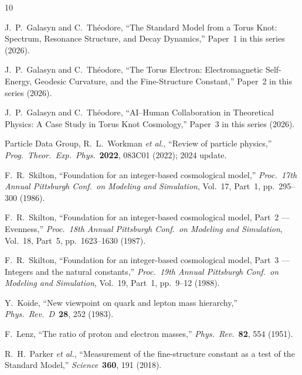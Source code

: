 \documentclass[11pt,a4paper]{article}
\begin{document}
\begin{thebibliography}{10}

J.~P.~Galasyn and C.~Th\'eodore,
``The Standard Model from a Torus Knot: Spectrum, Resonance Structure, and Decay Dynamics,''
Paper~1 in this series (2026).

J.~P.~Galasyn and C.~Th\'eodore,
``The Torus Electron: Electromagnetic Self-Energy, Geodesic Curvature, and the Fine-Structure Constant,''
Paper~2 in this series (2026).

J.~P.~Galasyn and C.~Th\'eodore,
``AI--Human Collaboration in Theoretical Physics: A Case Study in Torus Knot Cosmology,''
Paper~3 in this series (2026).

Particle Data Group, R.~L.~Workman \emph{et al.},
``Review of particle physics,''
\emph{Prog.\ Theor.\ Exp.\ Phys.}\ \textbf{2022}, 083C01 (2022); 2024 update.

F.~R.~Skilton,
``Foundation for an integer-based cosmological model,''
\emph{Proc.\ 17th Annual Pittsburgh Conf.\ on Modeling and Simulation},
Vol.~17, Part~1, pp.~295--300 (1986).

F.~R.~Skilton,
``Foundation for an integer-based cosmological model, Part~2 --- Evenness,''
\emph{Proc.\ 18th Annual Pittsburgh Conf.\ on Modeling and Simulation},
Vol.~18, Part~5, pp.~1623--1630 (1987).

F.~R.~Skilton,
``Foundation for an integer-based cosmological model, Part~3 --- Integers and the natural constants,''
\emph{Proc.\ 19th Annual Pittsburgh Conf.\ on Modeling and Simulation},
Vol.~19, Part~1, pp.~9--12 (1988).

Y.~Koide,
``New viewpoint on quark and lepton mass hierarchy,''
\emph{Phys.\ Rev.\ D}\ \textbf{28}, 252 (1983).

F.~Lenz,
``The ratio of proton and electron masses,''
\emph{Phys.\ Rev.}\ \textbf{82}, 554 (1951).

R.~H.~Parker \emph{et al.},
``Measurement of the fine-structure constant as a test of the Standard Model,''
\emph{Science}\ \textbf{360}, 191 (2018).

\end{thebibliography}
\end{document}
